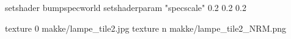 setshader bumpspecworld
setshaderparam "specscale" 0.2 0.2 0.2

texture 0 makke/lampe_tile2.jpg
texture n makke/lampe_tile2_NRM.png
